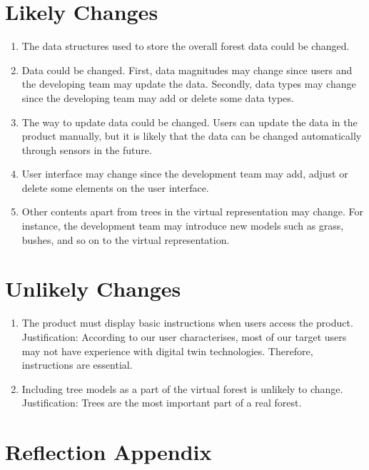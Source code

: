 \documentclass{article}
\begin{document}
\section{Likely Changes}
\begin{enumerate}
\item The data structures used to store the overall forest data could be changed.
\item Data could be changed. First, data magnitudes may change since users and the developing team
may update the data. Secondly, data types may change since the developing team may add or 
delete some data types.
\item The way to update data could be changed. Users can update the data in the product manually, but it is likely that the data can be changed automatically through sensors in the future.  
\item User interface may change since the development team may add, adjust or delete some elements on the user interface. 
\item Other contents apart from trees in the virtual representation may change. For instance, the development team may introduce new models such as grass, bushes, and so on to the virtual representation.
\end{enumerate}

\section{Unlikely Changes}
\begin{enumerate}
\item The product must display basic instructions when users access the product.\\
Justification: According to our user characterises, most of our target users may not have 
experience with digital twin technologies. Therefore, instructions are essential.
\item Including tree models 
as a part of the virtual forest is unlikely to change.\\ Justification: Trees are the most important
part of a real forest.
\end{enumerate}

\newpage

\appendix
\section{Reflection Appendix}
\end{document}
